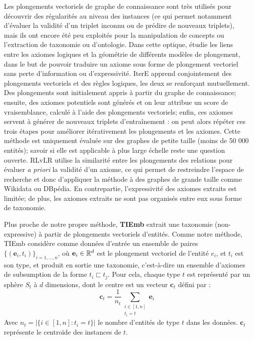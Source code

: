 Les plongements vectoriels de graphe de connaissance sont très utilisés pour découvrir des régularités au niveau des instances (ce qui permet notamment d'évaluer la validité d'un triplet inconnu ou de prédire de nouveaux triplets), mais ils ont encore été peu exploités pour la manipulation de concepts ou l'extraction de taxonomie ou d'ontologie. Dans cette optique, \cite{gutierrez2018knowledge} étudie les liens entre les axiomes logiques et la géométrie de différents modèles de plongement, dans le but de pouvoir traduire un axiome sous forme de plongement vectoriel sans perte d'information ou d'expressivité. IterE \cite{zhang2019iteratively} apprend conjointement des plongements vectoriels et des règles logiques, les deux se renforçant mutuellement. Des plongements sont initialement appris à partir du graphe de connaissance; ensuite, des axiomes potentiels sont générés et on leur attribue un score de vraisemblance, calculé à l'aide des plongements vectoriels; enfin, ces axiomes servent à générer de nouveaux triplets d'entraînement : on peut alors répéter ces trois étapes pour améliorer itérativement les plongements et les axiomes. Cette méthode est uniquement évaluée sur des graphes de petite taille (moins de 50 000 entités); savoir si elle est applicable à plus large échelle reste une question ouverte. RLvLR \cite{omran2018scalable} utilise la similarité entre les plongements des relations pour évaluer \textit{a priori} la validité d'un axiome, ce qui permet de restreindre l'espace de recherche et donc d'appliquer la méthode à des graphes de grande taille comme Wikidata ou DBpédia. En contrepartie, l'expressivité des axiomes extraits est limitée; de plus, les axiomes extraits ne sont pas organisés entre eux sous forme de taxonomie.

Plus proche de notre propre méthode, \textbf{TIEmb} \cite{ristoski2017large} extrait une taxonomie (non-expressive) à partir de plongements vectoriels d'entités. Comme notre méthode, TIEmb considère comme données d'entrée un ensemble de paires $\{(\textbf{e}_i, t_i) \}_{i=1, \ldots, n}$, où $\textbf{e}_i \in \mathbb{R}^d$ est le plongement vectoriel de l'entité $e_i$, et $t_i$ est son type, et produit en sortie une taxonomie, c'est-à-dire un ensemble d'axiomes de subsumption de la forme $t_i \sqsubset t_j$. Pour cela, chaque type $t$ est représenté par un sphère $S_t$ à $d$ dimensions, dont le centre est un vecteur $\textbf{c}_t$ défini par :
\begin{equation}
 \textbf{c}_t = \frac{1}{n_t} \sum_{\substack{i \in [1, n] \\ t_i = t}} \textbf{e}_i
\end{equation}
Avec $n_t = |\{ i \in [1, n] : t_i = t \}|$ le nombre d'entités de type $t$ dans les données. $\textbf{c}_t$ représente le centroïde des instances de $t$.

